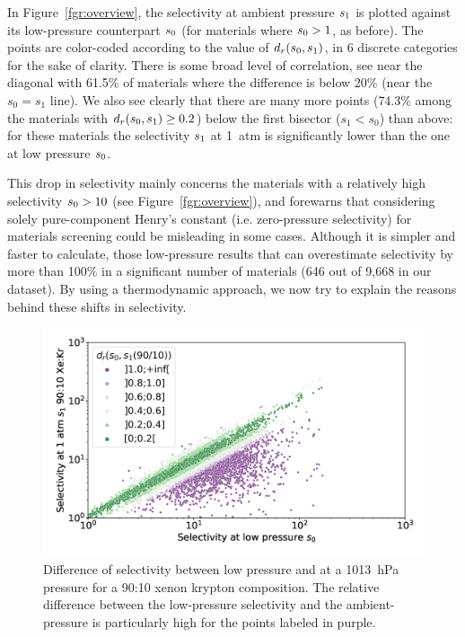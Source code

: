 \documentclass[main.tex]{subfiles}
\begin{document}
  In Figure~\ref{fgr:overview}, the selectivity at ambient pressure $s_{\text{1}}$ is plotted against its low-pressure counterpart $s_{\text{0}}$ (for materials where $s_{\text{0}} > 1$, as before). The points are color-coded according to the value of $d_r(s_{\text{0}},s_{\text{1}})$, in 6 discrete categories for the sake of clarity. There is some broad level of correlation, see near the diagonal with {61.5\%} of materials where the difference is below {20\%} (near the $s_0 = s_1$ line). We also see clearly that there are many more points ({74.3\%} among the materials with $d_r(s_{\text{0}},s_{\text{1}})\ge 0.2$) below the first bisector ($s_1 < s_0$) than above: for these materials the selectivity $s_{\text{1}}$ at 1~atm is significantly lower than the one at low pressure $s_{\text{0}}$.
  
  This drop in selectivity mainly concerns the materials with a relatively high selectivity $s_{\text{0}} > 10$ (see Figure~\ref{fgr:overview}), and forewarns that considering solely pure-component Henry's constant (i.e. zero-pressure selectivity) for materials screening could be misleading in some cases. Although it is simpler and faster to calculate, those low-pressure results that can overestimate selectivity by more than {100\%} in a significant number of materials (646 out of 9,668 in our dataset). By using a thermodynamic approach, we now try to explain the reasons behind these shifts in selectivity.


\begin{figure}[t]
  \centering
    \includegraphics[width=0.7\linewidth]{figures/2-thermo/s_0_vs_s_9010_overview_log.jpg}
    \caption{Difference of selectivity between low pressure and at a \SI{1013}{\hecto\pascal} pressure for a 90:10 xenon krypton composition. The relative difference between the low-pressure selectivity and the ambient-pressure is particularly high for the points labeled in purple.}
    \label{fgr:overview_9010}
  \end{figure}
\end{document}
